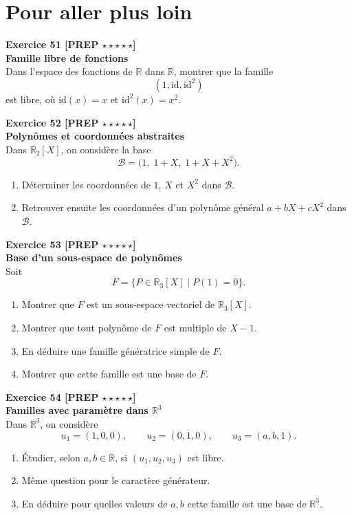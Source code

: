 \documentclass[11pt,a4paper]{article}
\begin{document}
\newpage

\section*{Pour aller plus loin}

\textbf{Exercice 51 [PREP $\star\star\star\star\star$]}\\
\textbf{Famille libre de fonctions}\\
Dans l’espace des fonctions de \(\mathbb{R}\) dans \(\mathbb{R}\), montrer que la famille
\[
(1,\mathrm{id},\mathrm{id}^2)
\]
est libre, où \(\mathrm{id}(x)=x\) et \(\mathrm{id}^2(x)=x^2\).

\textbf{Exercice 52 [PREP $\star\star\star\star\star$]}\\
\textbf{Polynômes et coordonnées abstraites}\\
Dans \(\mathbb{R}_2[X]\), on considère la base
\[
\mathcal B=\big(1,\;1+X,\;1+X+X^2\big).
\]
\begin{enumerate}[label=\alph*)]
    \item Déterminer les coordonnées de \(1\), \(X\) et \(X^2\) dans \(\mathcal B\).
    \item Retrouver ensuite les coordonnées d’un polynôme général \(a+bX+cX^2\) dans \(\mathcal B\).
\end{enumerate}

\textbf{Exercice 53 [PREP $\star\star\star\star\star$]}\\
\textbf{Base d’un sous-espace de polynômes}\\
Soit
\[
F=\{P\in\mathbb{R}_3[X]\mid P(1)=0\}.
\]
\begin{enumerate}[label=\alph*)]
    \item Montrer que \(F\) est un sous-espace vectoriel de \(\mathbb{R}_3[X]\).
    \item Montrer que tout polynôme de \(F\) est multiple de \(X-1\).
    \item En déduire une famille génératrice simple de \(F\).
    \item Montrer que cette famille est une base de \(F\).
\end{enumerate}

\textbf{Exercice 54 [PREP $\star\star\star\star\star$]}\\
\textbf{Familles avec paramètre dans \(\mathbb{R}^3\)}\\
Dans \(\mathbb{R}^3\), on considère
\[
u_1=(1,0,0),\qquad u_2=(0,1,0),\qquad u_3=(a,b,1).
\]
\begin{enumerate}[label=\alph*)]
    \item Étudier, selon \(a,b\in\mathbb{R}\), si \((u_1,u_2,u_3)\) est libre.
    \item Même question pour le caractère générateur.
    \item En déduire pour quelles valeurs de \(a,b\) cette famille est une base de \(\mathbb{R}^3\).
\end{enumerate}
\end{document}
